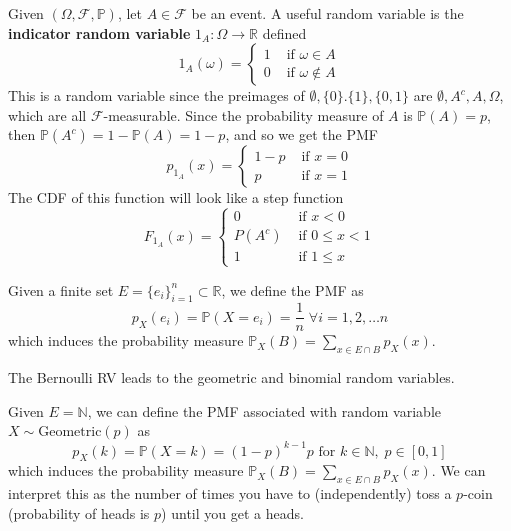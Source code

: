     \begin{definition}
      Given $(\Omega, \mathcal{F}, \mathbb{P})$, let $A \in \mathcal{F}$ be an event. A useful random variable is the \textbf{indicator random variable} $1_A: \Omega \longrightarrow \mathbb{R}$ defined  
      \begin{equation}
        1_A (\omega) = \begin{cases} 1 & \text{ if } \omega \in A \\ 0 & \text{ if } \omega \not\in A \end{cases}
      \end{equation}
      This is a random variable since the preimages of $\emptyset, \{0\}. \{1\}, \{0, 1\}$ are $\emptyset, A^c, A, \Omega$, which are all $\mathcal{F}$-measurable. Since the probability measure of $A$ is $\mathbb{P}(A) = p$, then $\mathbb{P}(A^c) = 1 - \mathbb{P}(A) = 1 - p$, and so we get the PMF 
      \begin{equation}
        p_{1_A} (x) = \begin{cases} 1 - p & \text{ if } x = 0 \\ p & \text{ if } x = 1 \end{cases}
      \end{equation}
      The CDF of this function will look like a step function 
      \begin{equation}
        F_{1_A} (x) = \begin{cases} 0 & \text{ if } x < 0  \\ P(A^c) & \text{ if } 0 \leq x < 1 \\ 1 & \text{ if } 1 \leq x \end{cases}
      \end{equation}
    \end{definition}

    \begin{example}
      Given a finite set $E = \{e_i\}_{i=1}^n \subset \mathbb{R}$, we define the PMF as 
      \begin{equation}
        p_X (e_i) = \mathbb{P}(X = e_i) = \frac{1}{n} \; \forall i = 1, 2, \ldots n
      \end{equation}
      which induces the probability measure $\mathbb{P}_X (B) = \sum_{x \in E \cap B} p_X (x)$. 
    \end{example}

    The Bernoulli RV leads to the geometric and binomial random variables. 

    \begin{example}
      Given $E = \mathbb{N}$, we can define the PMF associated with random variable $X \sim \mathrm{Geometric}(p)$ as 
      \begin{equation}
        p_X (k) =\mathbb{P}(X = k) = (1 - p)^{k-1} p \text{ for } k \in \mathbb{N}, \; p \in [0, 1]
      \end{equation}
      which induces the probability measure $\mathbb{P}_X (B) = \sum_{x \in E \cap B} p_X (x)$. We can interpret this as the number of times you have to (independently) toss a $p$-coin (probability of heads is $p$) until you get a heads. 
    \end{example}

